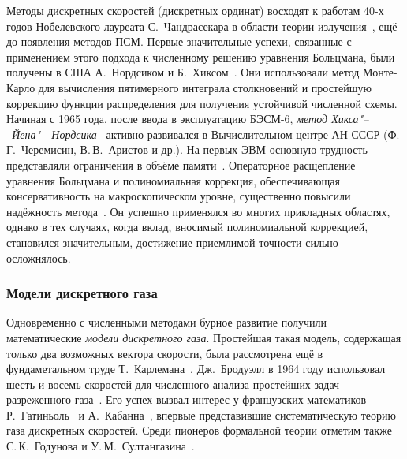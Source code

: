 Методы дискретных скоростей (дискретных ординат) восходят к работам 40-х годов Нобелевского лауреата С.~Чандрасекара
в области теории излучения~\cite{Chandrasekhar1950}, ещё до появления методов ПСМ.
Первые значительные успехи, связанные с применением этого подхода к численному решению уравнения Больцмана,
были получены в США А.~Нордсиком и Б.~Хиксом~\cite{Nordsieck1966, Nordsieck1970}.
Они использовали метод Монте-Карло для вычисления пятимерного интеграла столкновений
и простейшую коррекцию функции распределения для получения устойчивой численной схемы.
Начиная с 1965 года, после ввода в эксплуатацию БЭСМ-6, \emph{метод Хикса"--~Йена"--~Нордсика}~\cite{Nordsieck1966, Yen1984}
активно развивался в Вычислительном центре АН СССР (Ф.\,Г.~Черемисин, В.\,В.~Аристов и др.).
На первых ЭВМ основную трудность представляли ограничения в объёме памяти~\cite{Tcheremissine1970}.
Операторное расщепление уравнения Больцмана и полиномиальная коррекция,
обеспечивающая консервативность на макроскопическом уровне,
существенно повысили надёжность метода~\cite{Tcheremissine1980}.
Он успешно применялся во многих прикладных областях, однако в тех случаях, когда вклад,
вносимый полиномиальной коррекцией, становился значительным,
достижение приемлимой точности сильно осложнялось.

\subsubsection{Модели дискретного газа}

Одновременно с численными методами бурное развитие получили математические \emph{модели дискретного газа}.
Простейшая такая модель, содержащая только два возможных вектора скорости,
была рассмотрена ещё в фундаметальном труде Т.~Карлемана~\cite{Carleman1957}.
Дж.~Бродуэлл в 1964 году использовал шесть и восемь скоростей для численного анализа простейших задач
разреженного газа~\cite{Broadwell1964shock, Broadwell1964shear}.
Его успех вызвал интерес у французских математиков Р.~Гатиньоль~\cite{Gatignol1975} и А.~Кабанна~\cite{Cabannes1980},
впервые представившие систематическую теорию газа дискретных скоростей.
Среди пионеров формальной теории отметим также С.\,К.~Годунова и У.\,М.~Султангазина~\cite{Sultangazin1971}.



